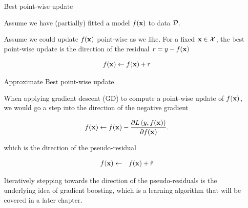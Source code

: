 \documentclass[11pt,compress,t,notes=noshow, xcolor=table]{beamer}
\begin{document}
\begin{frame}[t]{Best point-wise update}

    Assume we have (partially) fitted a model $f(\mathbf{x})$ to data $\mathcal{D}$. 

\lz 

Assume we could update $f(\mathbf{x})$ point-wise as we like. For a fixed $\mathbf{x} \in \mathcal{X}$, the best point-wise update is the direction of the residual $r = y - f(\mathbf{x})$

$$
	f(\mathbf{x}) \leftarrow f(\mathbf{x}) + r
$$


\begin{overlayarea}{\textwidth}{\textheight}
\begin{center}
\end{center}
\end{overlayarea} 

\end{frame}

\begin{vbframe}{Approximate Best point-wise update}

When applying gradient descent (GD) to compute a point-wise update of $f(\mathbf{x})$, we would go a step into the direction of the negative gradient

$$
	f(\mathbf{x}) \leftarrow f(\mathbf{x}) - \frac{\partial L\left(y, f(\mathbf{x})\right)}{\partial f(\mathbf{x})}. 
$$

which is the direction of the pseudo-residual

\begin{eqnarray*}
	f(\mathbf{x}) &\leftarrow& f(\mathbf{x}) + \tilde r\\ 
\end{eqnarray*}

Iteratively stepping towards the direction of the pseudo-residuals is the underlying idea of gradient boosting, which is a learning algorithm that will be covered in a later chapter. 


\end{vbframe}
\end{document}
